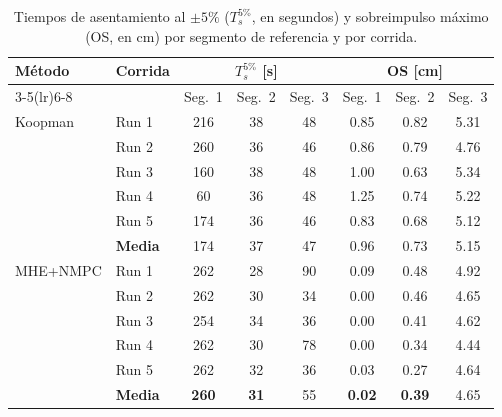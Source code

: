 \documentclass[12pt,letterpaper]{article}
\begin{document}
\begin{table}[H]
\centering
\caption{Tiempos de asentamiento al $\pm 5\%$ 
($T_s^{5\%}$, en segundos) y sobreimpulso máximo (OS, en 
cm) por segmento de referencia y por corrida.}
\label{tab:transient}
\footnotesize
\setlength{\tabcolsep}{3pt}
\begin{tabular}{llcccccc}
\toprule
\textbf{Método} & \textbf{Corrida} & 
\multicolumn{3}{c}{\textbf{$T_s^{5\%}$ [s]}} & 
\multicolumn{3}{c}{\textbf{OS [cm]}} \\
\cmidrule(lr){3-5}\cmidrule(lr){6-8}
& & Seg.~1 & Seg.~2 & Seg.~3 & 
  Seg.~1 & Seg.~2 & Seg.~3 \\
\midrule
Koopman 
  & Run 1 & 216 & 38 & 48 & 0.85 & 0.82 & 5.31 \\
  & Run 2 & 260 & 36 & 46 & 0.86 & 0.79 & 4.76 \\
  & Run 3 & 160 & 38 & 48 & 1.00 & 0.63 & 5.34 \\
  & Run 4 & 60  & 36 & 48 & 1.25 & 0.74 & 5.22 \\
  & Run 5 & 174 & 36 & 46 & 0.83 & 0.68 & 5.12 \\
  & \textbf{Media} & 174 & 37 & 47 & 0.96 & 0.73 & 5.15 \\
\midrule
MHE+NMPC
  & Run 1 & 262 & 28 & 90 & 0.09 & 0.48 & 4.92 \\
  & Run 2 & 262 & 30 & 34 & 0.00 & 0.46 & 4.65 \\
  & Run 3 & 254 & 34 & 36 & 0.00 & 0.41 & 4.62 \\
  & Run 4 & 262 & 30 & 78 & 0.00 & 0.34 & 4.44 \\
  & Run 5 & 262 & 32 & 36 & 0.03 & 0.27 & 4.64 \\
  & \textbf{Media} & \textbf{260} & \textbf{31} & 55 & 
    \textbf{0.02} & \textbf{0.39} & 4.65 \\
\bottomrule
\end{tabular}
\end{table}
\end{document}
